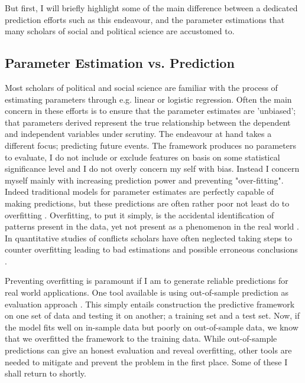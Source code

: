 \documentclass[a4paper]{article}
\begin{document}
But first, I will briefly highlight some of the main difference between a dedicated prediction efforts such as this endeavour, and the parameter estimations that many scholars of social and political science are accustomed to.\par

\subsection{Parameter Estimation vs. Prediction}

Most scholars of political and social science are familiar with the process of estimating parameters through e.g. linear or logistic regression. Often the main concern in these efforts is to ensure that the parameter estimates are 'unbiased'; that parameters derived represent the true relationship between the dependent and independent variables under scrutiny. The endeavour at hand takes a different focus; predicting future events. The framework produces no parameters to evaluate, I do not include or exclude features on basis on some statistical significance level and I do not overly concern my self with bias. Instead I concern myself mainly with increasing prediction power and preventing "over-fitting". Indeed traditional models for parameter estimates are perfectly capable of making predictions, but these predictions are often rather poor not least do to overfitting \citep{Ward_Greenhill_Bakke_2010}. Overfitting, to put it simply, is the accidental identification of patterns present in the data, yet not present as a phenomenon in the real world \citep[166-168]{Mcelreath_2018}. In quantitative studies of conflicts scholars have often neglected taking steps to counter overfitting leading to bad estimations and possible erroneous conclusions \citep{king_zeng_2001b, Ward_Greenhill_Bakke_2010}.\par

Preventing overfitting is paramount if I am to generate reliable predictions for real world applications. One tool available is using out-of-sample prediction as evaluation approach \citep{king_zeng_2001b, Ward_Greenhill_Bakke_2010, perry_2013, Schrodt_2014}. This simply entails construction the predictive framework on one set of data and testing it on another; a training set and a test set. Now, if the model fits well on in-sample data but poorly on out-of-sample data, we know that we overfitted the framework to the training data. While out-of-sample predictions can give an honest evaluation and reveal overfitting, other tools are needed to mitigate and prevent the problem in the first place. Some of these I shall return to shortly.\par
\end{document}
